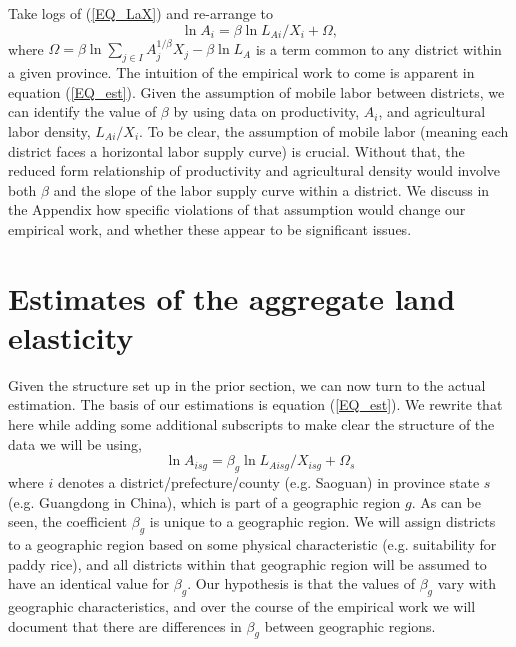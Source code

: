 \documentclass[11pt]{article}
\begin{document}
Take logs of (\ref{EQ_LaX}) and re-arrange to
\begin{equation}
\ln A_{i} = \beta \ln L_{Ai}/X_i + \Omega, \label{EQ_est}
\end{equation}
where $\Omega = \beta \ln \sum_{j\in I} A_{j}^{1/\beta}X_{j} - \beta \ln L_A$ is a term common to any district within a given province. The intuition of the empirical work to come is apparent in equation (\ref{EQ_est}). Given the assumption of mobile labor between districts, we can identify the value of $\beta$ by using data on productivity, $A_i$, and agricultural labor density, $L_{Ai}/X_i$. To be clear, the assumption of mobile labor (meaning each district faces a horizontal labor supply curve) is crucial. Without that, the reduced form relationship of productivity and agricultural density would involve both $\beta$ and the slope of the labor supply curve within a district. We discuss in the Appendix how specific violations of that assumption would change our empirical work, and whether these appear to be significant issues.

\section{Estimates of the aggregate land elasticity}
Given the structure set up in the prior section, we can now turn to the actual estimation. The basis of our estimations is equation (\ref{EQ_est}). We rewrite that here while adding some additional subscripts to make clear the structure of the data we will be using,
\begin{equation}
\ln A_{isg} = \beta_g \ln L_{Aisg}/X_{isg} + \Omega_s \label{EQ_model}
\end{equation}
where $i$ denotes a district/prefecture/county (e.g. Saoguan) in province state $s$ (e.g. Guangdong in China), which is part of a geographic region $g$. As can be seen, the coefficient $\beta_g$ is unique to a geographic region. We will assign districts to a geographic region based on some physical characteristic (e.g. suitability for paddy rice), and all districts within that geographic region will be assumed to have an identical value for $\beta_g$. Our hypothesis is that the values of $\beta_g$ vary with geographic characteristics, and over the course of the empirical work we will document that there are differences in $\beta_g$ between geographic regions.
\end{document}
